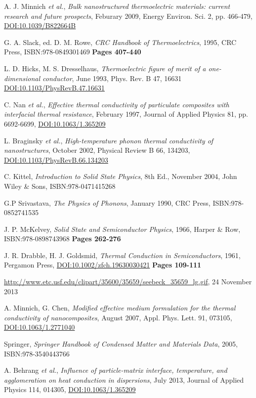\documentclass[12pt]{article}
\begin{document}
\begin{thebibliography}{11}
A. J. Minnich \emph{et al.},
\emph{Bulk nanostructured thermoelectric materials: current research and future prospects},
Feburary 2009,
Energy Environ. Sci. 2, pp. 466-479,
\href{http://dx.doi.org/10.1039/B822664B}{DOI:10.1039/B822664B}

G. A. Slack, ed. D. M. Rowe,
\emph{CRC Handbook of Thermoelectrics},
1995,
CRC Press,
ISBN:978-0849301469
\textbf{Pages 407-440}

L. D. Hicks, M. S. Dresselhaus,
\emph{Thermoelectric figure of merit of a one-dimensional conductor},
June 1993,
Phys. Rev. B 47, 16631
\href{http://dx.doi.org/10.1103/PhysRevB.47.16631}{DOI:10.1103/PhysRevB.47.16631}

C. Nan \emph{et al.},
\emph{Effective thermal conductivity of particulate composites with interfacial thermal resistance},
February 1997,
Journal of Applied Physics 81, pp. 6692-6699,
\href{http://dx.doi.org/10.1063/1.365209}{DOI:10.1063/1.365209}

L. Braginsky \emph{et al.},
\emph{High-temperature phonon thermal conductivity of nanostructures},
October 2002,
Physical Review B 66, 134203,
\href{http://dx.doi.org/10.1103/PhysRevB.66.134203}{DOI:10.1103/PhysRevB.66.134203}

C. Kittel,
\emph{Introduction to Solid State Physics}, 8th Ed.,
November 2004,
John Wiley \& Sons,
ISBN:978-0471415268

G.P Srivastava,
\emph{The Physics of Phonons},
January 1990,
CRC Press,
ISBN:978-0852741535

J. P. McKelvey,
\emph{Solid State and Semiconductor Physics},
1966,
Harper \& Row,
ISBN:978-0898743968
\textbf{Pages 262-276}

J. R. Drabble, H. J. Goldsmid,
\emph{Thermal Conduction in Semiconductors},
1961,
Pergamon Press,
\href{http://dx.doi.org/10.1002/zfch.19630030421}{DOI:10.1002/zfch.19630030421}
\textbf{Pages 109-111}

\url{http://www.etc.usf.edu/clipart/35600/35659/seebeck_35659_lg.gif},
24 November 2013

A. Minnich, G. Chen,
\emph{Modified effective medium formulation for the thermal conductivity of nanocomposites},
August 2007,
Appl. Phys. Lett. 91, 073105,
\href{http://dx.doi.org/10.1063/1.2771040}{DOI:10.1063/1.2771040}

Springer,
\emph{Springer Handbook of Condensed Matter and Materials Data},
2005,
ISBN:978-3540443766

A. Behrang \emph{et al.},
\emph{Influence of particle-matrix interface, temperature, and agglomeration on heat conduction in dispersions},
July 2013,
Journal of Applied Physics 114, 014305,
\href{http://dx.doi.org/10.1063/1.4812734}{DOI:10.1063/1.365209}

\end{thebibliography}
\end{document}
